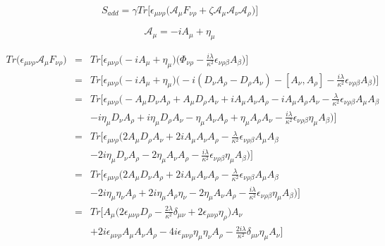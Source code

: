 \documentclass[10pt]{book}
\theoremstyle{break}
\begin{document}
\begin{equation*}
 S_{add} = \gamma Tr\Big[ \epsilon_{\mu \nu \rho} \bigg( \mathcal{A}_{\mu} F_{\nu \rho} + \zeta \mathcal{A}_{\mu} \mathcal{A}_{\nu} \mathcal{A}_{\rho} \bigg) \Big] 
\end{equation*}

\begin{equation*}
 \mathcal{A}_{\mu} = - i A_{\mu} + \eta_{\mu}
\end{equation*}

\begin{eqnarray*}
 Tr \big( \epsilon_{\mu \nu \rho} \mathcal{A}_{\mu} F_{\nu \rho} \big) &=& Tr \bigg[ \epsilon_{\mu \nu \rho} \big(- i A_{\mu} + \eta_{\mu}\big) \big( \Phi_{\nu \rho} - \frac{i \lambda }{\kappa^{2}} \epsilon_{\nu \rho \beta} A_{\beta} \big) \bigg] \nonumber \\
 &=& Tr \bigg[ \epsilon_{\mu \nu \rho} \big(- i A_{\mu} + \eta_{\mu}\big) \bigg( - i ( D_{\nu} A_{\rho}  -  D_{\rho} A_{\nu} ) - [ A_{\nu} , A_{\rho} ] - \frac{i \lambda }{\kappa^{2}} \epsilon_{\nu \rho \beta} A_{\beta} \bigg) \bigg] \nonumber \\
 &=& Tr \bigg[ \epsilon_{\mu \nu \rho} \bigg(- A_{\mu} D_{\nu} A_{\rho}  + A_{\mu} D_{\rho} A_{\nu} + i A_{\mu} A_{\nu} A_{\rho} - i A_{\mu} A_{\rho} A_{\nu}- \frac{\lambda}{\kappa^{2}} \epsilon_{\nu \rho \beta} A_{\mu} A_{\beta} \nonumber \\
 && - i \eta_{\mu} D_{\nu} A_{\rho} + i \eta_{\mu} D_{\rho} A_{\nu} - \eta_{\mu} A_{\nu} A_{\rho} + \eta_{\mu} A_{\rho} A_{\nu} - \frac{i \lambda }{\kappa^{2}} \epsilon_{\nu \rho \beta} \eta_{\mu} A_{\beta}  \bigg) \bigg] \nonumber \\
 &=& Tr \bigg[ \epsilon_{\mu \nu \rho} \bigg( 2 A_{\mu} D_{\rho} A_{\nu}  + 2 i A_{\mu} A_{\nu} A_{\rho} - \frac{\lambda}{\kappa^{2}} \epsilon_{\nu \rho \beta} A_{\mu} A_{\beta} \nonumber \\ 
 && - 2 i \eta_{\mu} D_{\nu} A_{\rho} - 2 \eta_{\mu} A_{\nu} A_{\rho} - \frac{i \lambda}{\kappa^{2}} \epsilon_{\nu \rho \beta} \eta_{\mu} A_{\beta}  \bigg) \bigg] \nonumber \\
 &=& Tr \bigg[ \epsilon_{\mu \nu \rho} \Bigg( 2 A_{\mu} D_{\nu} A_{\rho}  + 2 i A_{\mu} A_{\nu} A_{\rho} - \frac{\lambda}{\kappa^{2}} \epsilon_{\nu \rho \beta } A_{\mu} A_{\beta} \nonumber \\ 
 && - 2 i \eta_{\mu} \eta_{\nu} A_{\rho} + 2 i \eta_{\mu} A_{\rho} \eta_{\nu} - 2 \eta_{\mu} A_{\nu} A_{\rho} - \frac{i \lambda }{\kappa^{2}} \epsilon_{\nu \rho \beta} \eta_{\mu} A_{\beta}  \Bigg) \bigg]  \nonumber \\
 &=& Tr \bigg[ A_\mu \bigg( 2 \epsilon_{\mu \nu \rho} D_\rho - \frac{2 \lambda}{\kappa^{2}} \delta_{\mu \nu} + 2 \epsilon_{\mu \nu \rho} \eta_{\rho} \bigg) A_\nu \nonumber \\
 &&  + 2i \epsilon_{\mu \nu \rho} A_\mu A_\nu A_\rho - 4 i \epsilon_{\mu \nu \rho} \eta_\mu \eta_\nu A_\rho - \frac{2i \lambda}{\kappa^2} \delta_{\mu \nu} \eta_\mu A_\nu \bigg]
\end{eqnarray*}
\end{document}
